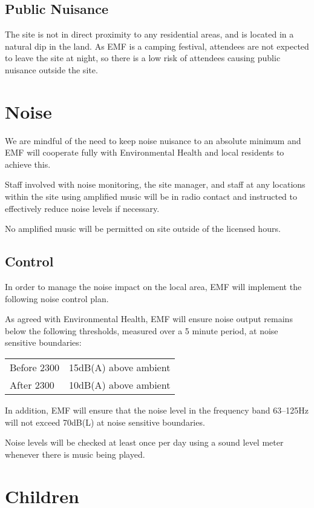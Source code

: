 \subsection{Public Nuisance}

The site is not in direct proximity to any residential areas, and is located in a
natural dip in the land. As EMF is a camping festival, attendees are not expected to leave the site
at night, so there is a low risk of attendees causing public nuisance outside the site.

\section{Noise}

We are mindful of the need to keep noise nuisance to an absolute minimum and EMF will cooperate fully
with Environmental Health and local residents to achieve this.

Staff involved with noise monitoring, the site manager, and staff at any locations within the site
using amplified music will be in radio contact and instructed to effectively reduce noise levels if
necessary.

No amplified music will be permitted on site outside of the licensed hours.

\subsection{Control}

In order to manage the noise impact on the local area, EMF will implement the following noise control plan.

As agreed with Environmental Health, EMF will ensure noise output remains below the following thresholds,
measured over a 5 minute period, at noise sensitive boundaries:

\begin{tabular}{l l}
  Before 2300 & 15dB(A) above ambient\\
  After 2300 & 10dB(A) above ambient\\
\end{tabular}

In addition, EMF will ensure that the noise level in the frequency band 63--125Hz will not exceed 70dB(L)
at noise sensitive boundaries.

Noise levels will be checked at least once per day using a sound level meter whenever there is music being played.

\section{Children}

